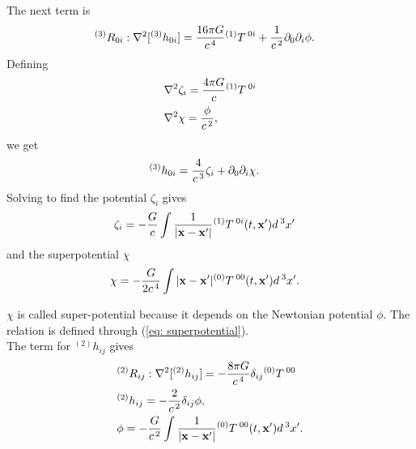 The next term is
\begin{align}
&^{(3)}R_{0i}: \nabla^2[^{(3)}h_{0i}] = \frac{16\pi G}{c^{\hspace{0.05cm}4}}{}^{(1)}T{}^{\hspace{0.07cm}0i} + \frac{1}{c^{\hspace{0.05cm}2}}\partial_0\partial_i\phi.
\end{align}
Defining
\begin{align}
&\nabla^2 \zeta_i = \frac{4\pi G}{c}{}^{(1)}T{}^{\hspace{0.07cm}0i}\\
\label{eq: superpotential}
 &\nabla^2 \chi = \frac{\phi}{c^{\hspace{0.05cm}2}},\\
 \end{align}
 we get 
 \begin{align}
 \label{eq: hoinewton}
&^{(3)}h_{0i} = \frac{4}{c^{\hspace{0.05cm}3}} \zeta_i + \partial_0\partial_i\chi.
\end{align}
Solving to find the potential $\zeta_i$ gives
\begin{align}
&\zeta_i = -\frac{G}{c}\int \frac{1}{|\mathbf{x}-\mathbf{x'}|}{}^{(1)}T{}^{\hspace{0.07cm}0i}(t,\mathbf{x'})d^{\hspace{0.07cm}3}x'
\end{align}
and the superpotential $\chi $
\begin{align}
&\chi = -\frac{G}{2c^{\hspace{0.05cm}4}}\int |\mathbf{x}-\mathbf{x'}|{}^{(0)}T{}^{\hspace{0.07cm}00}(t,\mathbf{x'})d^{\hspace{0.07cm}3}x'.
\end{align}

$\chi$ is called super-potential because it depends on the Newtonian potential $\phi$. The relation is defined through (\ref{eq: superpotential}).\\

The term for ${}^{(2)}h_{ij}$ gives
\begin{align}
&{}^{(2)}R_{ij}: \nabla^2[^{(2)}h_{ij}] = -\frac{8\pi G}{c^{\hspace{0.05cm}4}}\delta_{ij}{}^{(0)}T{}^{\hspace{0.07cm}00}\\
&{}^{(2)}h_{ij} = -\frac{2}{c^{\hspace{0.05cm}2}}\delta_{ij}\phi, \\
\label{eq: hjinewton}
&\phi = -\frac{G}{c^{\hspace{0.05cm}2}}\int \frac{1}{|\mathbf{x}-\mathbf{x'}|}{}^{(0)}T{}^{\hspace{0.07cm}00}(t,\mathbf{x'})d^{\hspace{0.07cm}3}x'.
\end{align}

